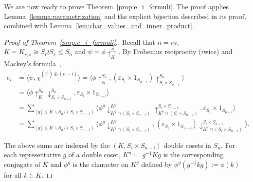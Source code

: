 We are now ready to prove Theorem~\ref{prop:e_i_formuli}. 
The proof applies Lemma~\ref{lemma:parametrization} and the explicit bijection described in its proof, combined with Lemma~\ref{lem:char_values_and_inner_product}. 

\begin{proof}[Proof of  Theorem~\ref{prop:e_i_formuli}.]
    Recall that $n=rs$, 
    $K=K_{r,s}\cong S_r\wr S_s\leq S_n$ and 
    $\psi = \phi\uparrow_K^{S_n}$. 
    By Frobenius reciprocity (twice) and 
    Mackey's formula~\cite[(5.2), Problem (5.6)]{Isaacs},
    \begin{equation}\label{Mackey_sum}
    \begin{split}
        e_i 
        &= \langle \psi, \chi^{(1^i) \oplus (n-i)} \rangle 
        = \langle \phi\uparrow_K^{S_n}, (\varepsilon_{S_i} \times 1_{S_{n-i}})\uparrow_{S_i \times S_{n-i}}^{S_n} \rangle \\
        &= \langle {\phi\uparrow_K^{S_n}}\downarrow_{S_i \times S_{n-i}}^{S_n}, \varepsilon_{S_i}\times 1_{S_{n-i}} \rangle \\
        &= 
        \sum_{[g] \in K \backslash S_n / (S_i \times S_{n-i})}
        \langle \phi^g\downarrow^{K^g}_{K^g \cap (S_i \times S_{n-i})}\uparrow_{K^g \cap (S_i \times S_{n-i})}^{S_i \times S_{n-i}}, \varepsilon_{S_i} \times 1_{S_{n-i}} \rangle \\
        &=
        \sum_{[g] \in K \backslash S_n / (S_i \times S_{n-i})}
        \langle \phi^g\downarrow^{K^g}_{K^g \cap (S_i \times S_{n-i})}, (\varepsilon_{S_i} \times 1_{S_{n-i}})\downarrow^{S_i \times S_{n-i}}_{K^g \cap  (S_i \times S_{n-i})} \rangle.
    \end{split}
    \end{equation}
		
    The above sums are indexed by the $(K,S_i\times S_{n-i})$ double cosets in $S_n$. 
    For each representative $g$ of a double coset, 
    $K^g := g^{-1}Kg$ is the corresponding conjugate of $K$ 
    and $\phi^g$ is the character on $K^g$ defined by
    $\phi^g(g^{-1}kg) := \phi(k)$ for all $k \in K$.


\end{proof}
